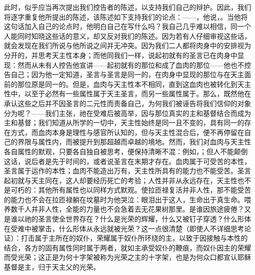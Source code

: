 此时，似乎应当再次提出我们控告者的陈述，以支持我们自己的辩护。因此，我们将逐字重复他所提出的陈述，该陈述如下支持我们的论点：——，他说，。当他将这句话加入自己的论点时，他明白自己在写什么吗？我自己几乎难以相信，同一个人能同时知晓这些话的意义，却又反对我们的陈述。因为若有人仔细审视这些话，就会发现在我们所说与他所说之间并无冲突。因为我们二人都将肉身中的安排视为分开的，并思考天主性本身；而他同我们一样，说起初就有的圣言已在肉身中显现：然而从未有人控告他宣讲——起初就有的那位和成了血肉的那位——他也不控告自己；因为他一定知道，圣言与圣言是同一的，在肉身中显现的那位与在天主面前的那位原是同一的。但是，血肉与天主性本不相同，直到这血肉也被转化到天主性中，以至于必然有一些属性属于天主圣言，而另一些属性属于。那么，既然他在承认这些之后并不因圣言的二元性而责备自己，为何我们被诬告将我们信仰的对象分为呢？——我们主张，祂在受难后被高举，因与那位真实的主和基督结合而成为主和基督；我们知道从所学的一切中，天主性始终是同一且不变的，具有同一的存在方式，而血肉本身是理性与感官所认知的，但与天主性混合后，便不再停留在自己的界限与属性内，而被提升到那超越而卓越的境地。然而，我们对血肉与天主性各自属性的默观，只要各自独自被思考，便保持清晰不混：例如，；但人不能颠倒这话，说后者是先于时间的，或者说圣言在末期才存在。血肉属于可受苦的本性，圣言属于运作的本性；血肉不能造出万有，天主性所具有的能力也不能受苦。圣言起初就与天主同在，这人却要经历死亡的考验；人性并非从永远存在，天主性也不是可朽的：其他所有属性也以同样方式默观。使拉匝禄复活并非人性，那不能受苦的能力也不会在拉匝禄躺在坟墓时为他哭泣：眼泪出于这人，生命出于真生命。喂养数千人并非人性，全能的力量也不会急着去无花果树那里。是谁因旅途疲倦？又是谁以祂的圣言使全世界存在？什么是光荣的辉耀，什么又被钉子穿透？什么形体在受难中被掌击，什么形体从永远就被光荣？这一点很清楚（即使人不详细思考论证）：打击属于主所在的奴仆，荣耀属于奴仆所环绕的主，以致于因接触与本性的结合，各方的固有属性同时属于两者，就如主承受奴仆的鞭痕，而奴仆因主的荣耀而受光荣；这正是为何十字架被称为光荣之主的十字架，也是为何众口都宣认耶稣基督是主，归于天主父的光荣。\par

